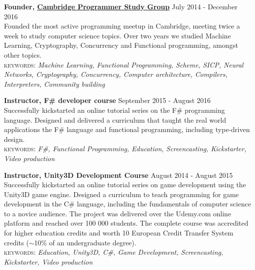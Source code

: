\documentclass[10pt]{article}
\newcommand{\linkto}[2]{\href{#1}{\color{darkblue}\setulcolor{darkblue}\ul{#2}}}
\newcommand{\blankline}{\quad\pagebreak[2]}
\begin{document}
\blankline

\textbf{Founder, \linkto{https://www.meetup.com/Cambridge-Programmers-Study-Group/}{Cambridge Programmer Study Group}}  \hfill July 2014 - December 2016\\
Founded the most active programming meetup in Cambridge, meeting twice a week to study computer science topics. Over two years we studied Machine Learning, Cryptography, Concurrency and Functional programming, amongst other topics.\\
{\small \textsc{keywords:} \emph{Machine Learning, Functional Programming, Scheme, SICP, Neural Networks, Cryptography, Concurrency, Computer architecture, Compilers, Interpreters, Community building}}

\blankline

\textbf{Instructor, F\# developer course}  \hfill September 2015 - August 2016\\
Successfully kickstarted an online tutorial series on the F\# programming language. Designed and delivered a curriculum that taught the real world applications the F\# language and functional programming, including type-driven design.\\
{\small \textsc{keywords:} \emph{F\#, Functional Programming, Education, Screencasting, Kickstarter, Video production}}

\blankline

\textbf{Instructor, Unity3D Development Course}  \hfill August 2014 - August 2015 \\
Successfully kickstarted an online tutorial series on game development using the Unity3D game engine. Designed a curriculum to teach programming for game development in the C\# language, including the fundamentals of computer science to a novice audience. The project was delivered over the Udemy.com online platform and reached over 100 000 students. The complete course was accredited for higher education credits and worth 10 European Credit Transfer System credits ($\sim$10\% of an undergraduate degree).\\
{\small \textsc{keywords:} \emph{Education, Unity3D, C\#, Game Development, Screencasting, Kickstarter, Video production}}

\blankline

\end{document}
